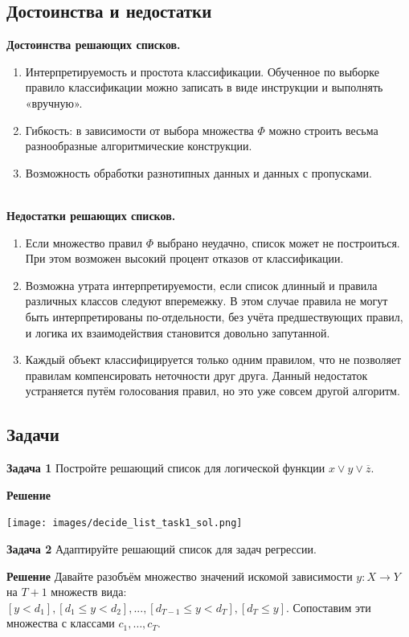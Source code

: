 \subsection{Достоинства и недостатки}

\textbf{Достоинства решающих списков.}
\begin{enumerate}
    \item Интерпретируемость и простота классификации. Обученное по выборке правило классификации можно записать в виде инструкции и выполнять «вручную».
    \item Гибкость: в зависимости от выбора множества $\Phi$ можно строить весьма разнообразные алгоритмические конструкции.
    \item Возможность обработки разнотипных данных и данных с пропусками.
\end{enumerate}
\\
\textbf{Недостатки решающих списков.}
\begin{enumerate}
    \item Если множество правил $\Phi$ выбрано неудачно, список может не построиться. При этом возможен высокий процент отказов от классификации.
    \item Возможна утрата интерпретируемости, если список длинный и правила различных классов следуют вперемежку. В этом случае правила не могут быть
    интерпретированы по-отдельности, без учёта предшествующих правил, и логика их взаимодействия становится довольно запутанной.
    \item Каждый объект классифицируется только одним правилом, что не позволяет
    правилам компенсировать неточности друг друга. Данный недостаток устраняется путём голосования правил, но это уже совсем другой алгоритм.
\end{enumerate}

\subsection{Задачи}

\textbf{Задача 1}
Постройте решающий список для логической функции $x \vee y \vee \overline{z}.$

\textbf{Решение}

\texttt{[image: images/decide\_list\_task1\_sol.png]}

\textbf{Задача 2}
Адаптируйте решающий список для задач регрессии.

\textbf{Решение}
Давайте разобъём множество значений искомой зависимости $y: X \rightarrow{} Y$ на $T + 1$ множеств вида:
$[y < d_1], [d_1 \leq y < d_2], ..., [d_{T-1} \leq y < d_T], [d_T \leq y].$ 
Сопоставим эти множества с классами $c_1, \dots, c_T$.

